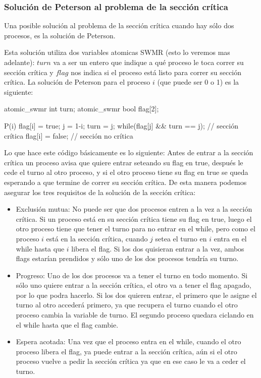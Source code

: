 \documentclass{article}
\begin{document}
\subsubsection{Soluci\'on de Peterson al problema de la secci\'on cr\'itica}

Una posible soluci\'on al problema de la secci\'on cr\'itica cuando hay s\'olo dos procesos, es la soluci\'on de Peterson.

Esta soluci\'on utiliza dos variables atomicas SWMR (esto lo veremos mas adelante): $turn$ va a ser un entero que indique a qu\'e proceso le toca correr su secci\'on cr\'itica y $flag$ nos indica si el proceso está listo para correr su secci\'on cr\'itica. La soluci\'on de Peterson para el proceso $i$ (que puede ser 0 o 1) es la siguiente:

\begin{code}
atomic_swmr int turn;
atomic_swmr bool flag[2];

P(i) {
    flag[i] = true;
    j = 1-i;
    turn = j;
    while(flag[j] && turn == j);
    // sección crítica
    flag[i] = false;
    // sección no crítica
}
\end{code}

Lo que hace este c\'odigo b\'asicamente es lo siguiente: Antes de entrar a la secci\'on cr\'itica un proceso avisa que quiere entrar seteando su flag en true, despu\'es le cede el turno al otro proceso, y si el otro proceso tiene su flag en true se queda esperando a que termine de correr su secci\'on cr\'itica. De esta manera podemos asegurar los tres requisitos de la soluci\'on de la secci\'on cr\'itica:

\begin{itemize}
\item Exclusi\'on mutua: No puede ser que dos procesos entren a la vez a la secci\'on cr\'itica. Si un proceso est\'a en su secci\'on cr\'itica tiene su flag en true, luego el otro proceso tiene que tener el turno para no entrar en el while, pero como el proceso $i$ est\'a en la secci\'on cr\'itica, cuando $j$ setea el turno en $i$ entra en el while hasta que $i$ libera el flag. Si los dos quisieran entrar a la vez, ambos flags estar\'ian prendidos y s\'olo uno de los dos procesos tendr\'ia su turno.
\item Progreso: Uno de los dos procesos va a tener el turno en todo momento. Si s\'olo uno quiere entrar a la secci\'on cr\'itica, el otro va a tener el flag apagado, por lo que podra hacerlo. Si los dos quieren entrar, el primero que le asigne el turno al otro accederá primero, ya que recupera el turno cuando el otro proceso cambia la variable de turno. El segundo proceso quedara ciclando en el while hasta que el flag cambie.
\item Espera acotada: Una vez que el proceso entra en el while, cuando el otro proceso libera el flag, ya puede entrar a la secci\'on cr\'itica, a\'un si el otro proceso vuelve a pedir la secci\'on cr\'itica ya que en ese caso le va a ceder el turno.
\end{itemize}
\end{document}
